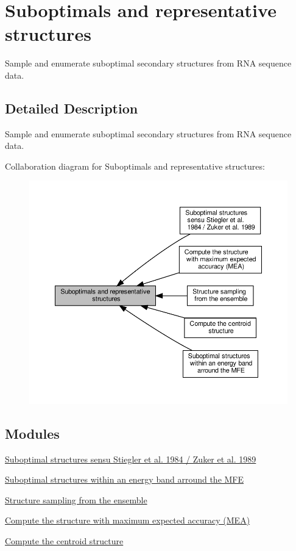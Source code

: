 \hypertarget{group__subopt__and__representatives}{}\section{Suboptimals and representative structures}
\label{group__subopt__and__representatives}


Sample and enumerate suboptimal secondary structures from R\+NA sequence data.  




\subsection{Detailed Description}
Sample and enumerate suboptimal secondary structures from R\+NA sequence data. 

Collaboration diagram for Suboptimals and representative structures\+:
\nopagebreak
\begin{figure}[H]
\begin{center}
\leavevmode
\includegraphics[width=350pt]{group__subopt__and__representatives}
\end{center}
\end{figure}
\subsection*{Modules}
\begin{DoxyCompactItemize}
\item 
\hyperlink{group__subopt__zuker}{Suboptimal structures sensu Stiegler et al. 1984 / Zuker et al. 1989}
\item 
\hyperlink{group__subopt__wuchty}{Suboptimal structures within an energy band arround the M\+FE}
\item 
\hyperlink{group__subopt__stochbt}{Structure sampling from the ensemble}
\item 
\hyperlink{group__mea__fold}{Compute the structure with maximum expected accuracy (\+M\+E\+A)}
\item 
\hyperlink{group__centroid__fold}{Compute the centroid structure}
\end{DoxyCompactItemize}
